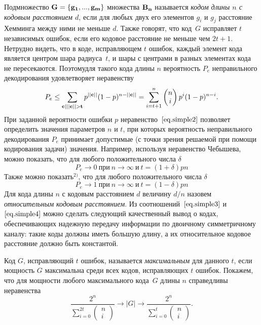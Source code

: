 \documentclass[12pt]{article}
\numberwithin{equation}{section}
\begin{document}
Подмножество $\bf G = \{\bf g_1,...,g_m\}$ множества $\bf B_n$ называется {\it кодом длины $n$ с кодовым расстоянием $d$}, если для любых двух его элементов $g_i$ и $g_j$ расстояние Хемминга между ними не меньше $d$. Также говорят, что код~$G$ исправляет $t$ независимых ошибок, если его кодовое расстояние не меньше чем $2t + 1$. Нетрудно видеть, что в коде, исправляющем $t$ ошибок, каждый элемент кода является центром шара радиуса~$t$, и шары с центрами в разных элементах кода не пересекаются. Поэтомудля такого кода длины $n$ вероятность $P_e$ неправильного декодирования удовлетворяет неравенству
\begin{equation}
P_e \le \sum_{\bf c | ||\bf c ||>t}p^{||\bf{c}||}(1-p)^{n-||\bf c||} = \sum_{i=t+1}^n \begin{pmatrix} n \\ i  \end{pmatrix} p^i(1-p)^{n-i}.
\label{eq.simple2} 
\end{equation}
При заданной вероятности ошибки $p$ неравенство~$\eqref{eq.simple2}$ позволяет определить значения параметров $n$ и $t$, при которых вероятность неправильного декодирования $P_e$ принимает допустимые (с точки зрения решаемой при помощи кодирования задачи) значения. Например, используя неравенство Чебышева, можно показать, что для любого положительного числа $\delta$
\begin{equation}
P_e \rightarrow 0~\text{при}~ n \rightarrow \infty~\text{и}~ t = (1+\delta)pn
\label{eq.simple3} 
\end{equation}
Также можно показать$^{2)}$, что для любого положительного числа $\delta$
\begin{equation}
P_e \rightarrow 1~\text{при}~ n \rightarrow \infty~\text{и}~ t = (1-\delta)pn
\label{eq.simple4} 
\end{equation}
Для кода длины $n$ с кодовым расстоянием $d$ величину $d/n$ назовем {\it относительным кодовым расстоянием}. Из соотношений~$\eqref{eq.simple3}$
и~$\eqref{eq.simple4}$ можно сделать следующий качественный вывод о кодах, обеспечивающих надежную передачу информации по двоичному симметричному каналу: такие коды должны иметь большую длину, а их относительное кодовое расстояние должно быть константой.

Код $G$, исправляющий $t$ ошибок, называется {\it максимальным} для данного $t$, если мощность $G$ максимальна среди всех кодов, исправляющих $t$ ошибок. Покажем, что для мощности любого максимального кода~$G$ длины $n$ справедливы неравенства
\begin{equation}
\frac{2^n}{\sum_{i=0}^{2t} \begin{pmatrix} n \\ i  \end{pmatrix}} \rightarrow |G| \rightarrow \frac{2^n}{\sum_{i=0}^t \begin{pmatrix} n \\ i  \end{pmatrix}}.
\label{eq.simple5} 
\end{equation}
\end{document}
